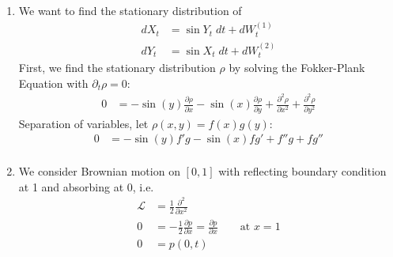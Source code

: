 \documentclass[12pt]{article}
\theoremstyle{plain}
\theoremstyle{definition}
\theoremstyle{remark}
\begin{document}
\begin{enumerate}
      \item %
        We want to find the stationary distribution of
        \begin{align*}
          dX_t &= \sin Y_t \; dt + dW_t^{(1)} \\
          dY_t &= \sin X_t \; dt + dW_t^{(2)}
        \end{align*}
        First, we find the stationary distribution $\rho$ by solving the
        Fokker-Plank Equation with $\partial_t \rho=0$:
        \begin{align*}
          0 &=
          - \sin(y) \frac{\partial \rho}{\partial x}
          - \sin(x) \frac{\partial \rho}{\partial y}
          + \frac{\partial^2 \rho}{\partial x^2}
          + \frac{\partial^2 \rho}{\partial y^2}
        \end{align*}
        Separation of variables, let $\rho(x,y) = f(x) g(y)$:
        \begin{align*}
          0 &=
          - \sin(y) f' g
          - \sin(x) f g'
          + f'' g
          + f g''\\
        \end{align*}


  \item %
    We consider Brownian motion on $[0,1]$ with reflecting boundary
    condition at 1 and absorbing at 0, i.e.
    \begin{align*}
      \mathscr{L} &= \frac{1}{2} \frac{\partial^2}{\partial x^2}\\
      0
      &= -\frac{1}{2} \frac{\partial p}{\partial x}
      = \frac{\partial p}{\partial x}
      \qquad \text{at $x=1$}\\
      0 &= p(0,t)
    \end{align*}


\end{enumerate}
\end{document}
